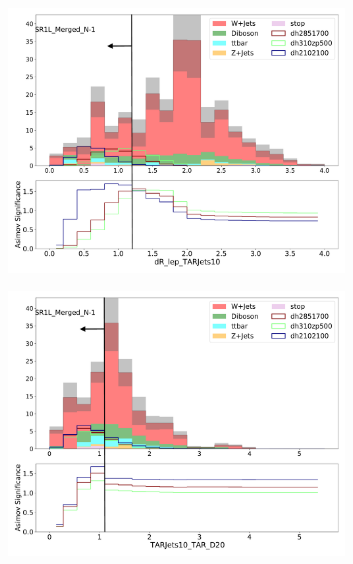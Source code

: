 \begin{figure}[htbp]
\begin{subfigure}{0.49\textwidth}
     \includegraphics[width = 0.98\textwidth]{Figures/4/N1m/dR_lep_TARJets10.pdf}
     \caption{\drTARl}
     \end{subfigure}
     \begin{subfigure}{0.49\textwidth}
     \includegraphics[width = 0.98\textwidth]{Figures/4/N1m/TARJets10_TAR_D20.pdf}
     \caption{\DtwoTAR}
     \end{subfigure}
     \begin{subfigure}{0.49\textwidth}

\end{subfigure}
\end{figure}
